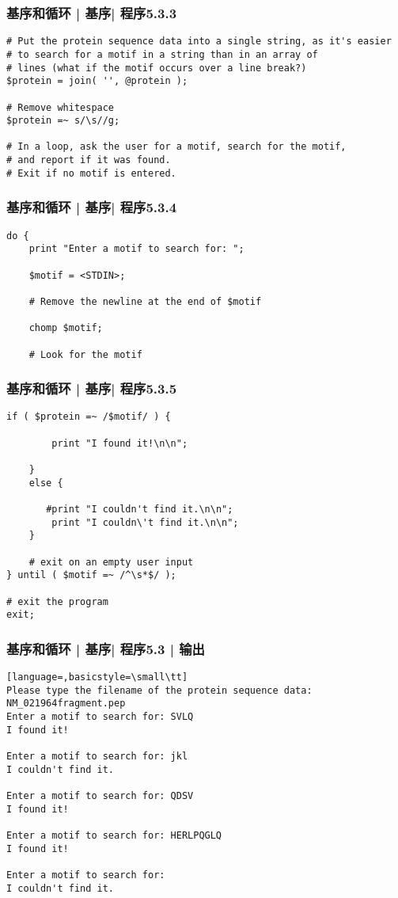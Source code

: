 \begin{frame}[fragile]
  \frametitle{基序和循环 | 基序| 程序5.3.3}
\begin{lstlisting}[firstnumber=27]
# Put the protein sequence data into a single string, as it's easier
# to search for a motif in a string than in an array of
# lines (what if the motif occurs over a line break?)
$protein = join( '', @protein );

# Remove whitespace
$protein =~ s/\s//g;

# In a loop, ask the user for a motif, search for the motif,
# and report if it was found.
# Exit if no motif is entered.
\end{lstlisting}
\end{frame}

\begin{frame}[fragile]
  \frametitle{基序和循环 | 基序| 程序5.3.4}
\begin{lstlisting}[firstnumber=38]
do {
    print "Enter a motif to search for: ";

    $motif = <STDIN>;

    # Remove the newline at the end of $motif

    chomp $motif;

    # Look for the motif
\end{lstlisting}
\end{frame}

\begin{frame}[fragile]
  \frametitle{基序和循环 | 基序| 程序5.3.5}
\begin{lstlisting}[firstnumber=49]
    if ( $protein =~ /$motif/ ) {

        print "I found it!\n\n";

    }
    else {

       #print "I couldn't find it.\n\n";
        print "I couldn\'t find it.\n\n";
    }

    # exit on an empty user input
} until ( $motif =~ /^\s*$/ );

# exit the program
exit;
\end{lstlisting}
\end{frame}

\begin{frame}[fragile]
  \frametitle{基序和循环 | 基序| 程序5.3 | 输出}
\begin{lstlisting}[language=,basicstyle=\small\tt]
Please type the filename of the protein sequence data:
NM_021964fragment.pep
Enter a motif to search for: SVLQ
I found it!

Enter a motif to search for: jkl
I couldn't find it.

Enter a motif to search for: QDSV
I found it!

Enter a motif to search for: HERLPQGLQ
I found it!

Enter a motif to search for: 
I couldn't find it.
\end{lstlisting}
\end{frame}

